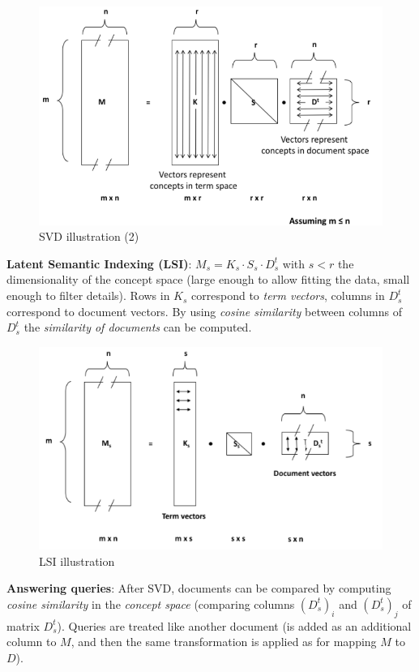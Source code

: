     \begin{figure}[htp]
      \centering
        \includegraphics[width=.7\textwidth]{images/SVD2.png}
        \caption{SVD illustration (2)}
        \label{fig:svd2}
    \end{figure}

    \textbf{Latent Semantic Indexing (LSI)}: $M_s = K_s \cdot S_s\cdot D_s^t$ with $s<r$ the dimensionality of the concept space (large enough to allow fitting the data, small enough to filter details). Rows in $K_s$ correspond to \emph{term vectors}, columns in $D_s^t$ correspond to document vectors. By using \emph{cosine similarity} between columns of $D_s^t$ the \emph{similarity of documents} can be computed.

    \begin{figure}[htp]
      \centering
        \includegraphics[width=.7\textwidth]{images/LSI.png}
        \caption{LSI illustration}
        \label{fig:LSI}
    \end{figure}

    \textbf{Answering queries}: After SVD, documents can be compared by computing \emph{cosine similarity} in the \emph{concept space} (comparing columns $(D_s^t)_i$ and $(D_s^t)_j$ of matrix $D_s^t$). Queries are treated like another document (is added as an additional column to $M$, and then the same transformation is applied as for mapping $M$ to $D$).

